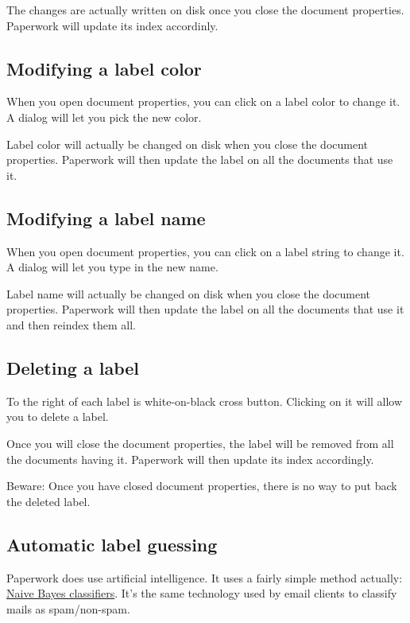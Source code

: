 \documentclass[10pt,a4paper]{article}
\begin{document}
The changes are actually written on disk once you close the document
properties. Paperwork will update its index accordinly.


\subsection{Modifying a label color}

When you open document properties, you can click on a label color to change
it. A dialog will let you pick the new color.

Label color will actually be changed on disk when you close the document
properties. Paperwork will then update the label on all the documents that use
it.


\subsection{Modifying a label name}

When you open document properties, you can click on a label string to change
it. A dialog will let you type in the new name.

Label name will actually be changed on disk when you close the document
properties. Paperwork will then update the label on all the documents that use
it and then reindex them all.


\subsection{Deleting a label}

To the right of each label is white-on-black cross button. Clicking on it
will allow you to delete a label.

Once you will close the document properties, the label will be removed from
all the documents having it. Paperwork will then update its index accordingly.

Beware: Once you have closed document properties, there is no way to put back
the deleted label.


\subsection{Automatic label guessing}

Paperwork does use artificial intelligence. It uses a fairly simple method
actually:
\href{https://en.wikipedia.org/wiki/Naive_Bayes_classifier}{Naive Bayes classifiers}.
It's the same technology used by email clients to classify mails as spam/non-spam.
\end{document}
